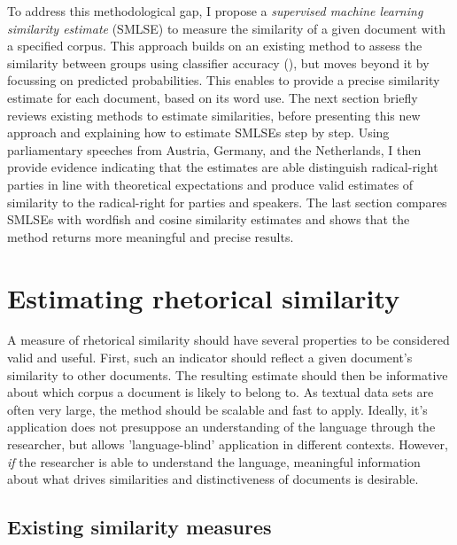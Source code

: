\documentclass{article}
\begin{document}
To address this methodological gap, I propose a \textit{supervised machine learning similarity estimate} (SMLSE) to measure the similarity of a given document with a specified corpus. This approach builds on an existing method to assess the similarity between groups using classifier accuracy (\cite{Peterson2018}), but moves beyond it by focussing on predicted probabilities. This enables to provide a precise similarity estimate for each document, based on its word use. The next section briefly reviews existing methods to estimate similarities, before presenting this new approach and explaining how to estimate SMLSEs step by step. Using parliamentary speeches from Austria, Germany, and the Netherlands, I then provide evidence indicating that the estimates are able distinguish radical-right parties in line with theoretical expectations and produce valid estimates of similarity to the radical-right for parties and speakers. The last section compares SMLSEs with wordfish and cosine similarity estimates and shows that the method returns more meaningful and precise results.\par


\section{Estimating rhetorical similarity}

A measure of rhetorical similarity should have several properties to be considered valid and useful. First, such an indicator should reflect a given document's similarity to other documents. The resulting estimate should then be informative about which corpus a document is likely to belong to. As textual data sets are often very large, the method should be scalable and fast to apply. Ideally, it's application does not presuppose an understanding of the language through the researcher, but allows 'language-blind' application in different contexts. However, \textit{if} the researcher is able to understand the language, meaningful information about what drives similarities and distinctiveness of documents is desirable. \par


\subsection{Existing similarity measures}
\end{document}

